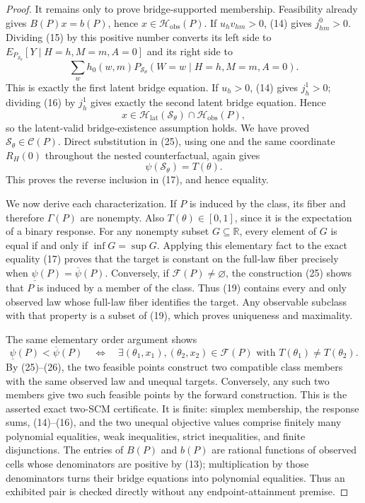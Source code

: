 \documentclass{article}
\begin{document}
\begin{proof}
It remains only to prove bridge-supported membership.  Feasibility already
gives \(B(P)x=b(P)\), hence
\(x\in\mathcal H_{\mathrm{obs}}(P)\).  If \(u_hv_{hm}>0\), (14) gives
\(j^0_{hm}>0\).  Dividing (15) by this positive number converts its left side
to
\(E_{P_{\mathcal S_\theta}}[Y\mid H=h,M=m,A=0]\) and its right side to
\[
 \sum_w h_0(w,m)
 P_{\mathcal S_\theta}(W=w\mid H=h,M=m,A=0).
\]
This is exactly the first latent bridge equation.  If \(u_h>0\), (14) gives
\(j^1_h>0\); dividing (16) by \(j^1_h\) gives exactly the second latent
bridge equation.  Hence
\[
 x\in\mathcal H_{\mathrm{lat}}(\mathcal S_\theta)
      \cap\mathcal H_{\mathrm{obs}}(P),
\]
so the latent-valid bridge-existence assumption holds.  We have proved
\(\mathcal S_\theta\in\mathcal C(P)\).  Direct substitution in (25), using
one and the same coordinate \(R_H(0)\) throughout the nested counterfactual,
again gives
\[
 \psi(\mathcal S_\theta)=T(\theta).
 \tag{26}
\]
This proves the reverse inclusion in (17), and hence equality.

We now derive each characterization.  If \(P\) is induced by the class, its
fiber and therefore \(\Gamma(P)\) are nonempty.  Also
\(T(\theta)\in[0,1]\), since it is the expectation of a binary response.
For any nonempty subset \(G\subseteq\mathbb R\), every element of \(G\) is
equal if and only if \(\inf G=\sup G\).  Applying this elementary fact to
the exact equality (17) proves that the target is constant on the full-law
fiber precisely when
\(\underline\psi(P)=\overline\psi(P)\).  Conversely, if
\(\mathcal F(P)\ne\varnothing\), the construction (25) shows that \(P\) is
induced by a member of the class.  Thus (19) contains every and only observed
law whose full-law fiber identifies the target.  Any observable subclass with
that property is a subset of (19), which proves uniqueness and maximality.

The same elementary order argument shows
\[
 \underline\psi(P)<\overline\psi(P)
 \quad\Longleftrightarrow\quad
 \exists (\theta_1,x_1),(\theta_2,x_2)\in\mathcal F(P)
 \text{ with }T(\theta_1)\ne T(\theta_2).
\]
By (25)--(26), the two feasible points construct two compatible class members
with the same observed law and unequal targets.  Conversely, any such two
members give two such feasible points by the forward construction.  This is
the asserted exact two-SCM certificate.  It is finite: simplex membership,
the response sums, (14)--(16), and the two unequal objective values comprise
finitely many polynomial equalities, weak inequalities, strict inequalities,
and finite disjunctions.  The entries of \(B(P)\) and \(b(P)\) are rational
functions of observed cells whose denominators are positive by (13);
multiplication by those denominators turns their bridge equations into
polynomial equalities.  Thus an exhibited pair is checked directly without
any endpoint-attainment premise.


\end{proof}
\end{document}
